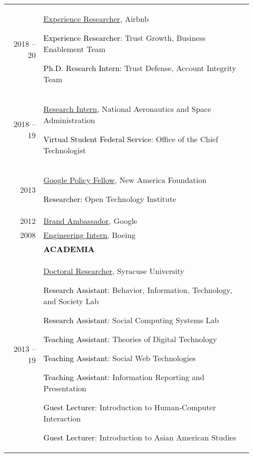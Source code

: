 \documentclass[11pt]{article}
\begin{document}
{{\begin{longtable}{Rp{0.75in}p{5.0in}}
\footnotesize{2018 -- 20} & \href{https://airbnb.com/}{Experience Researcher}, Airbnb \par \textcolor{black}{Experience Researcher}: Trust Growth, Business Enablement Team \par \textcolor{black}{Ph.D. Research Intern}: Trust Defense, Account Integrity Team\\

\footnotesize{2018 -- 19} & \href{https://vsfs.state.gov/about}{Research Intern}, National Aeronautics and Space Administration \par \textcolor{black}{Virtual Student Federal Service}: Office of the Chief Technologist\\

\footnotesize{2013} & \href{https://www.google.com/policyfellowship/2013fellows.html}{Google Policy Fellow}, New America Foundation \par \textcolor{black}{Researcher}: Open Technology Institute\\

\footnotesize{2012} & \href{https://students.googleblog.com/2012/09/a-new-class-of-google-student.html}{Brand Ambassador}, Google\\

\footnotesize{2008} & \href{https://www.engr.washington.edu/current/studentprogs/alva}{Engineering Intern}, Boeing\\

& \textcolor{black}{\uppercase{\textbf{Academia}}}\\

\footnotesize{2013 -- 19} & \href{https://ischool.syr.edu/research/research-centers/behavior-information-technology-and-society-bits-lab/}{{Doctoral Researcher}}, Syracuse University \par \textcolor{black}{Research Assistant}: Behavior, Information, Technology, and Society Lab \par \textcolor{black}{Research Assistant}: Social Computing Systems Lab \par \textcolor{black}{Teaching Assistant}: Theories of Digital Technology \par \textcolor{black}{Teaching Assistant}: Social Web Technologies \par \textcolor{black}{Teaching Assistant}: Information Reporting and Presentation \par \textcolor{black}{Guest Lecturer}: Introduction to Human-Computer Interaction \par \textcolor{black}{Guest Lecturer}: Introduction to Asian American Studies\\


\end{longtable}}}
\end{document}
